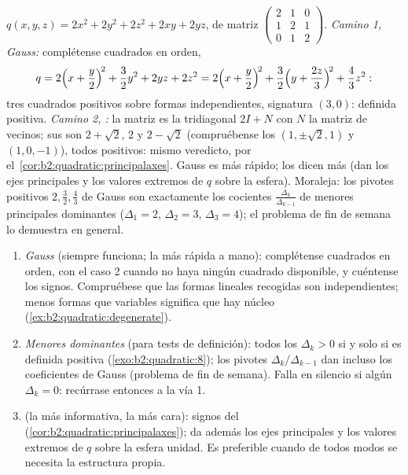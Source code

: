 \begin{example}\label{ex:b2:quadratic:tworoads}
$q(x, y, z) = 2x^2 + 2y^2 + 2z^2 + 2xy + 2yz$, de matriz
$\begin{pmatrix} 2 & 1 & 0\\ 1 & 2 & 1\\ 0 & 1 & 2
\end{pmatrix}$. \emph{Camino 1, Gauss:} complétense cuadrados en
orden,
\[
q = 2\Bigl(x + \frac y2\Bigr)^{\!2} + \frac32 y^2 + 2yz + 2z^2
= 2\Bigl(x + \frac y2\Bigr)^{\!2}
+ \frac32\Bigl(y + \frac{2z}{3}\Bigr)^{\!2} + \frac43 z^2 :
\]
tres cuadrados positivos sobre formas independientes, signatura
$(3, 0)$: definida positiva. \emph{Camino 2, :} la
matriz es la tridiagonal $2I + N$ con $N$ la matriz de vecinos; sus
 son $2 + \sqrt2$, $2$ y $2 - \sqrt2$ (compruébense
los  $(1, \pm\sqrt2, 1)$ y $(1, 0, -1)$), todos
positivos: mismo veredicto, por el~\cref{cor:b2:quadratic:principalaxes}. Gauss es más rápido; los
 dicen más (dan los ejes principales y los valores
extremos de $q$ sobre la esfera). Moraleja: los pivotes positivos
$2, \frac32, \frac43$ de Gauss son exactamente los cocientes
$\frac{\Delta_k}{\Delta_{k-1}}$ de menores principales dominantes
($\Delta_1 = 2$, $\Delta_2 = 3$, $\Delta_3 = 4$); el problema de fin
de semana lo demuestra en general.
\end{example}

\begin{method}\label{met:b2:quadratic:signature}
\begin{enumerate}
  \item \emph{Gauss} (siempre funciona; la más rápida a mano):
        complétense cuadrados en orden, con el caso 2 cuando no haya
        ningún cuadrado disponible, y cuéntense los signos.
        Compruébese que las formas lineales recogidas son
        independientes; menos formas que variables significa que hay
        núcleo (\cref{ex:b2:quadratic:degenerate}).
  \item \emph{Menores dominantes} (para tests de definición): todos
        los $\Delta_k > 0$ si y solo si es definida positiva
        (\cref{exo:b2:quadratic:8}); los pivotes
        $\Delta_k/\Delta_{k-1}$ dan incluso los coeficientes de
        Gauss (problema de fin de semana). Falla en silencio si
        algún $\Delta_k = 0$: recúrrase entonces a la vía 1.
  \item \emph{} (la más informativa, la más cara):
        signos del 
        (\cref{cor:b2:quadratic:principalaxes}); da además los ejes
        principales y los valores extremos de $q$ sobre la esfera
        unidad. Es preferible cuando de todos modos se necesita la
        estructura propia.
\end{enumerate}
\end{method}

